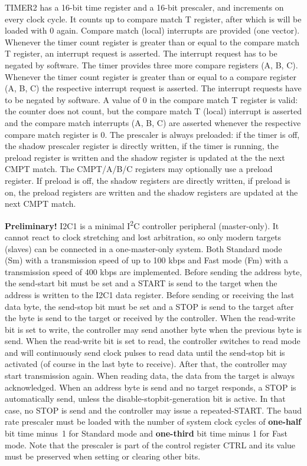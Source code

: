 \documentclass[12pt]{article}
\begin{document}
TIMER2 has a 16-bit time register and a 16-bit prescaler, and increments on every clock cycle. It counts up to compare match T register, after which is will be loaded with 0 again. Compare match (local) interrupts are provided (one vector). Whenever the timer count register is greater than or equal to the compare match T register, an interrupt request is asserted. The interrupt request has to be negated by software. The timer provides three more compare registers (A, B, C). Whenever the timer count register is greater than or equal to a compare register (A, B, C) the respective interrupt request is asserted. The interrupt requests have to be negated by software. A value of 0 in the compare match T register is valid: the counter does not count, but the compare match T (local) interrupt is asserted and the compare match interrupts (A, B, C) are asserted whenever the respective compare match register is 0. The prescaler is always preloaded: if the timer is off, the shadow prescaler register is directly written, if the timer is running, the preload register is written and the shadow register is updated at the the next CMPT match. The CMPT/A/B/C registers may optionally use a preload register. If preload is off, the shadow registers are directly written, if preload is on, the preload registers are written and the shadow registers are updated at the next CMPT match.

\textbf{Preliminary!}
I2C1 is a minimal I\textsuperscript{2}C controller peripheral (master-only). It cannot react to clock stretching and lost arbitration, so only modern targets (slaves) can be connected in a one-master-only system. Both Standard mode (Sm) with a transmission speed of up to 100 kbps and Fast mode (Fm) with a transmission speed of 400 kbps are implemented. Before sending the address byte, the send-start bit must be set and a START is send to the target when the address is written to the I2C1 data register. Before sending or receiving the last data byte, the send-stop bit must be set and a STOP is send to the target after the byte is send to the target or received by the controller. When the read-write bit is set to write, the controller may send another byte when the previous byte is send. When the read-write bit is set to read, the controller switches to read mode and will continuously send clock pulses to read data until the send-stop bit is activated (of course in the last byte to receive). After that, the controller may start transmission again. When reading data, the data from the target is always acknowledged. When an address byte is send and no target responds, a STOP is automatically send, unless the disable-stopbit-generation bit is active. In that case, no STOP is send and the controller may issue a repeated-START. The baud rate prescaler must be loaded with the number of system clock cycles of \textbf{one-half} bit time minus~1 for Standard mode and \textbf{one-third} bit time minus 1 for Fast mode. Note that the prescaler is part of the control register CTRL and its value must be preserved when setting or clearing other bits.
\end{document}
